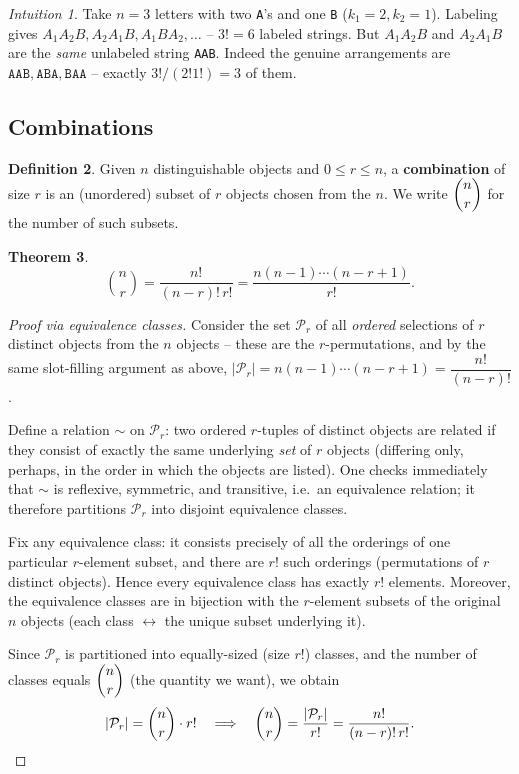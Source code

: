 \documentclass[11pt]{article}
\theoremstyle{definition}
\newtheorem{definition}{Definition}[section]
\theoremstyle{plain}
\newtheorem{theorem}[definition]{Theorem}
\theoremstyle{remark}
\newtheorem{intuition}[definition]{Intuition}
\begin{document}
\begin{intuition}
Take $n=3$ letters with two \texttt{A}'s and one \texttt{B} ($k_1=2, k_2=1$). Labeling gives
$A_1 A_2 B, A_2 A_1 B, A_1 B A_2, \dots$ -- $3! = 6$ labeled strings. But $A_1A_2B$ and $A_2A_1B$
are the \emph{same} unlabeled string \texttt{AAB}. Indeed the genuine arrangements are
$\texttt{AAB}, \texttt{ABA}, \texttt{BAA}$ -- exactly $3!/(2!1!) = 3$ of them.
\end{intuition}

\subsection{Combinations}

\begin{definition}
Given $n$ distinguishable objects and $0 \le r \le n$, a \textbf{combination} of size $r$ is an
(unordered) subset of $r$ objects chosen from the $n$. We write $\dbinom{n}{r}$ for the number of
such subsets.
\end{definition}

\begin{theorem}
\label{thm:binom-coeff}
\[
\binom{n}{r} = \frac{n!}{(n-r)!\,r!} = \frac{n(n-1)\cdots(n-r+1)}{r!}.
\]
\end{theorem}

\begin{proof}[Proof via equivalence classes]
Consider the set $\mathcal{P}_r$ of all \emph{ordered} selections of $r$ distinct objects from the
$n$ objects -- these are the $r$-permutations, and by the same slot-filling argument as above,
$|\mathcal{P}_r| = n(n-1)\cdots(n-r+1) = \dfrac{n!}{(n-r)!}$.

Define a relation $\sim$ on $\mathcal{P}_r$: two ordered $r$-tuples of distinct objects are related
if they consist of exactly the same underlying \emph{set} of $r$ objects (differing only, perhaps,
in the order in which the objects are listed). One checks immediately that $\sim$ is reflexive,
symmetric, and transitive, i.e.\ an equivalence relation; it therefore partitions $\mathcal{P}_r$
into disjoint equivalence classes.

Fix any equivalence class: it consists precisely of all the orderings of one particular
$r$-element subset, and there are $r!$ such orderings (permutations of $r$ distinct objects).
Hence every equivalence class has exactly $r!$ elements. Moreover, the equivalence classes are in
bijection with the $r$-element subsets of the original $n$ objects (each class $\leftrightarrow$
the unique subset underlying it).

Since $\mathcal{P}_r$ is partitioned into equally-sized (size $r!$) classes, and the number of
classes equals $\dbinom{n}{r}$ (the quantity we want), we obtain
\[
|\mathcal{P}_r| = \binom{n}{r} \cdot r! \quad\Longrightarrow\quad \binom{n}{r} =
\frac{|\mathcal{P}_r|}{r!} = \frac{n!}{(n-r)!\,r!}. \qedhere
\]
\end{proof}
\end{document}
